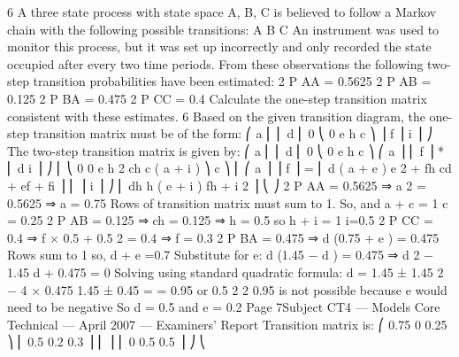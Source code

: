 \documentclass[a4paper,12pt]{article}
\begin{document}
6
A three state process with state space {A, B, C} is believed to follow a Markov chain
with the following possible transitions:
A
B
C
An instrument was used to monitor this process, but it was set up incorrectly and only
recorded the state occupied after every two time periods. From these observations the
following two-step transition probabilities have been estimated:
2
P AA
= 0.5625
2
P AB
= 0.125
2
P BA
= 0.475
2
P CC
= 0.4
Calculate the one-step transition matrix consistent with these estimates.
6
Based on the given transition diagram, the one-step transition matrix must be of the
form:
⎛ a
⎜
⎜ d
⎜ 0
⎝
0
e
h
c ⎞
⎟
f ⎟
i ⎟ ⎠
The two-step transition matrix is given by:
⎛ a
⎜
⎜ d
⎜ 0
⎝
0
e
h
c ⎞ ⎛ a
⎟ ⎜
f ⎟ * ⎜ d
i ⎟ ⎠ ⎜ ⎝ 0
0
e
h
2
ch
c ( a + i ) ⎞
c ⎞ ⎜ ⎛ a
⎟
⎟
f ⎟ = ⎜ d ( a + e ) e 2 + fh cd + ef + fi ⎟
⎜
⎟
i ⎟ ⎠ ⎜ dh
h ( e + i )
fh + i 2 ⎟
⎝
⎠
2
P AA
= 0.5625 ⇒ a 2 = 0.5625 ⇒ a = 0.75
Rows of transition matrix must sum to 1.
So,
and
a + c = 1
c = 0.25
2
P AB
= 0.125 ⇒ ch = 0.125 ⇒ h = 0.5
so
h + i = 1
i=0.5
2
P CC
= 0.4 ⇒ f × 0.5 + 0.5 2 = 0.4 ⇒ f = 0.3
2
P BA
= 0.475 ⇒ d (0.75 + e ) = 0.475
Rows sum to 1 so, d + e =0.7
Substitute for e:
d (1.45 − d ) = 0.475 ⇒ d 2 − 1.45 d + 0.475 = 0
Solving using standard quadratic formula:
d =
1.45 ± 1.45 2 − 4 × 0.475 1.45 ± 0.45
=
= 0.95 or 0.5
2
2
0.95 is not possible because e would need to be negative
So
d = 0.5 and e = 0.2
Page 7Subject CT4 — Models Core Technical — April 2007 — Examiners’ Report
Transition matrix is:
⎛ 0.75 0 0.25 ⎞
⎜ 0.5 0.2 0.3 ⎟
⎜
⎟
⎜ 0
0.5 0.5 ⎟ ⎠
⎝
\end{document}
